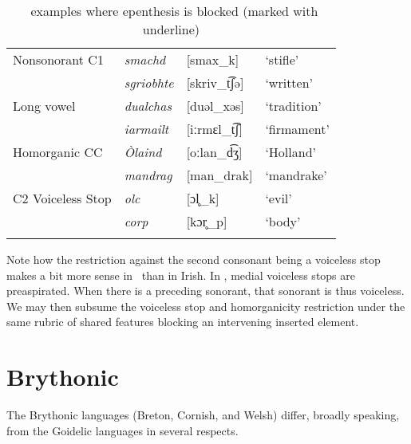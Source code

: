 \documentclass[output=paper,colorlinks,citecolor=brown]{langscibook}
\begin{document}
\begin{table}
\caption{\sg\ examples where epenthesis is blocked (marked with underline)}
\label{sg.blocked.tab}
\begin{tabular}[t]{l>{\itshape}lll}
\lsptoprule
Nonsonorant C1    & smachd    & [smax\_k]      & `stifle'     \\
                  & sgriobhte & [skriv\_t͡ʃə]   & `written'    \\
Long vowel        & dualchas  & [duəl\_xəs]    & `tradition'  \\
                  & iarmailt  & [iːrmɛl\_t͡ʃ]   & `firmament'  \\
Homorganic CC     & \`Olaind  & [oːlan\_d͡ʒ]    & `Holland'    \\
                  & mandrag   & [man\_drak]    & `mandrake'   \\
C2 Voiceless Stop & olc     & [ɔl̥\_k]        & `evil'       \\
                  & corp      & [kɔr̥\_p]       & `body'        \\
\lspbottomrule
\end{tabular}
\end{table}

Note how the restriction against the second consonant being a voiceless stop makes a bit more sense in \sg\ than in Irish. In \sg, medial voiceless stops are preaspirated. When there is a preceding sonorant, that sonorant is thus voiceless. We may then subsume the voiceless stop and homorganicity restriction under the same rubric of shared features blocking an intervening inserted element.


\section{Brythonic}

The Brythonic languages (Breton, Cornish, and Welsh) differ, broadly speaking, from the Goidelic languages in several respects.
\end{document}
